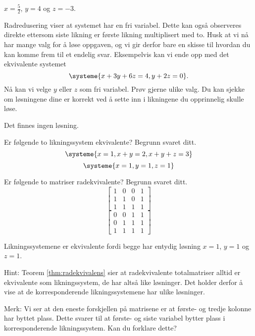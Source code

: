 \begin{losning}
\begin{punkt}
$x=\frac{5}{2}$, $y=4$ og $z=-3$.
\end{punkt}
\begin{punkt}
Radredusering viser at systemet har en fri variabel. Dette kan også observeres direkte ettersom siste likning er første likning multiplisert med to. Husk at vi nå har mange valg for å løse oppgaven, og vi gir derfor bare en skisse til hvordan du kan komme frem til et endelig svar. Eksempelvis kan vi ende opp med det ekvivalente systemet 
$$
\systeme{
	x + 3y +  6z = 4,
	    y  +  2z = 0
}.\\
$$
Nå kan vi velge $y$ eller $z$ som fri variabel. Prøv gjerne ulike valg. Du kan sjekke om løsningene dine er korrekt ved å sette inn i likningene du opprinnelig skulle løse.
\end{punkt}
\begin{punkt}
Det finnes ingen løsning.
\end{punkt}
\end{losning}


\begin{oppgave}
\begin{punkt}
Er følgende to likningssystem ekvivalente? Begrunn svaret ditt.
$$
\systeme{
	x = 1,
	x + y = 2,
	x + y + z = 3
}
$$
$$
\systeme{
	x = 1,
	y = 1,
	z = 1
}
$$
\end{punkt}
\begin{punkt}
Er følgende to matriser radekvivalente? Begrunn svaret ditt.
$$
\begin{bmatrix}
1 & 0 & 0 & 1\\
1 & 1 & 0 & 1\\
1 & 1 & 1 & 1
\end{bmatrix}
$$
$$
\begin{bmatrix}
0 & 0 & 1 & 1\\
0 & 1 & 1 & 1\\
1 & 1 & 1 & 1
\end{bmatrix}
$$

\end{punkt}
\end{oppgave}

\begin{losning}
\begin{punkt}
Likningssystemene er ekvivalente fordi begge har entydig løsning $x=1$, $y=1$ og $z=1$.
\end{punkt}
\begin{punkt}
Hint: Teorem \ref{thm:radekvivalens} sier at radekvivalente totalmatriser alltid er ekvivalente som likningssystem, de har altså like løsninger. Det holder derfor å vise at de korresponderende likningssystemene har ulike løsninger.

Merk: Vi ser at den eneste forskjellen på matrisene er at første- og tredje kolonne har byttet plass. Dette svarer til at første- og siste variabel bytter plass i korresponderende likningssystem. Kan du forklare dette?
\end{punkt}
\end{losning}



